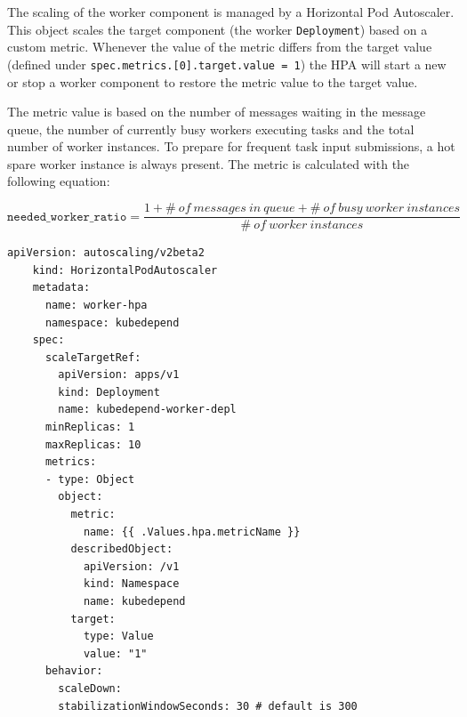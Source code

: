 
The scaling of the worker component is managed by a Horizontal Pod Autoscaler. This object scales the target component (the worker \texttt{Deployment}) based on a custom metric. Whenever the value of the metric differs from the target value (defined under \texttt{spec.metrics.[0].target.value = 1}) the HPA will start a new or stop a worker component to restore the metric value to the target value.

The metric value is based on the number of messages waiting in the message queue, the number of currently busy workers executing tasks and the total number of worker instances. To prepare for frequent task input submissions, a hot spare worker instance is always present. The metric is calculated with the following equation:

\[
	\texttt{needed\_worker\_ratio} = \frac{1 + \#\ of\ messages\ in\ queue + \#\ of\ busy\ worker\ instances}{\#\ of\ worker\ instances}
\]

\vspace{0.5cm}
\begin{minipage}{\linewidth}
	\begin{lstlisting}[caption={Worker \texttt{Horizontal Pod Autoscaler}}]
	apiVersion: autoscaling/v2beta2
	kind: HorizontalPodAutoscaler
	metadata:
	  name: worker-hpa
	  namespace: kubedepend
	spec:
	  scaleTargetRef:
	    apiVersion: apps/v1
	    kind: Deployment
	    name: kubedepend-worker-depl
	  minReplicas: 1
	  maxReplicas: 10
      metrics:
      - type: Object
	    object:
	      metric:
            name: {{ .Values.hpa.metricName }}
          describedObject:
            apiVersion: /v1
            kind: Namespace
            name: kubedepend
          target:
            type: Value
            value: "1"
      behavior:
        scaleDown:
        stabilizationWindowSeconds: 30 # default is 300\end{lstlisting}
\end{minipage}











